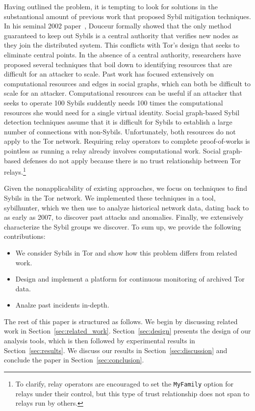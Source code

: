 Having outlined the problem, it is tempting to look for solutions in the
substantional amount of previous work that proposed Sybil mitigation
techniques.  In his seminal 2002 paper~\cite{Douceur2002a}, Douceur formally
showed that the only method guaranteed to keep out Sybils is a central
authority that verifies new nodes as they join the distributed system.  This
conflicts with Tor's design that seeks to eliminate central points.  In the
absence of a central authority, researchers have proposed several techniques
that boil down to identifying resources that are difficult for an attacker to
scale.  Past work has focused extensively on computational resources and edges
in social graphs, which can both be difficult to scale for an attacker.
Computational resources can be useful if an attacker that seeks to operate 100
Sybils suddently needs 100 times the computational resources she would need for
a single virtual identity.  Social graph-based Sybil detection techniques
assume that it is difficult for Sybils to establish a large number of
connections with non-Sybils.  Unfortunately, both resources do not apply to the
Tor network. Requiring relay operators to complete proof-of-works is pointless
as running a relay already involves computational work.  Social graph-based
defenses do not apply because there is no trust relationship between Tor
relays.\footnote{To clarify, relay operators are encouraged to set the
\texttt{MyFamily} option for relays under their control, but this type of
trust relationship does not span to relays run by others.}

Given the nonapplicability of existing approaches, we focus on techniques to
find Sybils in the Tor network.  We implemented these techniques in a tool,
sybilhunter, which we then use to analyze historical network data, dating back
to as early as 2007, to discover past attacks and anomalies.  Finally, we
extensively characterize the Sybil groups we discover.  To sum up, we provide
the following contributions:
\begin{itemize}
	\item We consider Sybils in Tor and show how this problem differs from
		related work.
	\item Design and implement a platform for continuous monitoring of archived
		Tor data.
	\item Analze past incidents in-depth.
\end{itemize}

The rest of this paper is structured as follows.  We begin by discussing
related work in Section~\ref{sec:related_work}.  Section~\ref{sec:design}
presents the design of our analysis tools, which is then followed by
experimental results in Section~\ref{sec:results}.  We discuss our results in
Section~\ref{sec:discussion} and conclude the paper in
Section~\ref{sec:conclusion}.
